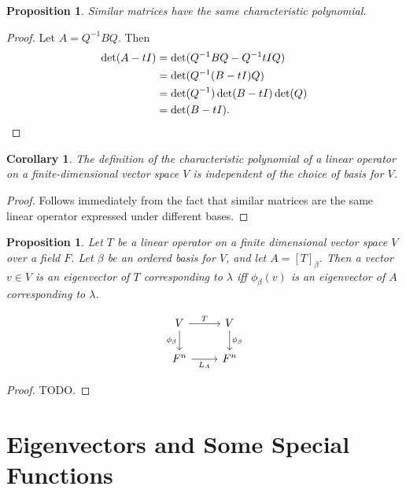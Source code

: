 \documentclass[12pt]{article}
\theoremstyle{plain}
\newtheorem{corollary}[theorem]{Corollary}
\newtheorem{proposition}[theorem]{Proposition}
\theoremstyle{definition}
\theoremstyle{remark}
\begin{document}
\begin{proposition}
Similar matrices have the same characteristic polynomial.
\end{proposition}

\begin{proof}
Let $A = Q^{-1} B Q$. Then 
\begin{align*}
\det(A - tI) &= \det(Q^{-1} B Q - Q^{-1} tI Q) \\
&= \det(Q^{-1}(B - tI)Q) \\
&= \det(Q^{-1})\det(B - tI)\det(Q) \\
&= \det(B - tI).\qedhere
\end{align*}
\end{proof}

\begin{corollary}
The definition of the characteristic polynomial of a linear operator on a finite-dimensional vector space $V$ is independent of the choice of basis for $V$.
\end{corollary}

\begin{proof}
Follows immediately from the fact that similar matrices are the same linear operator expressed under different bases.
\end{proof}

\begin{proposition}
Let $T$ be a linear operator on a finite dimensional vector space $V$ over a field $F$. Let $\beta$ be an ordered basis for $V$, and let $A = [T]_\beta$. Then a vector $v \in V$ is an eigenvector of $T$ corresponding to $\lambda$ iff $\phi_\beta(v)$ is an eigenvector of $A$ corresponding to $\lambda$.
\end{proposition}

\begin{figure}[H]
$$\begin{tikzcd}
V \arrow{r}{T} \arrow[swap]{d}{\phi_\beta} & V \arrow{d}{\phi_\beta} \\
F^n \arrow[swap]{r}{L_A} & F^n
\end{tikzcd}$$
\end{figure}

\begin{proof}
TODO.
\end{proof}

\section{Eigenvectors and Some Special Functions}
\end{document}

